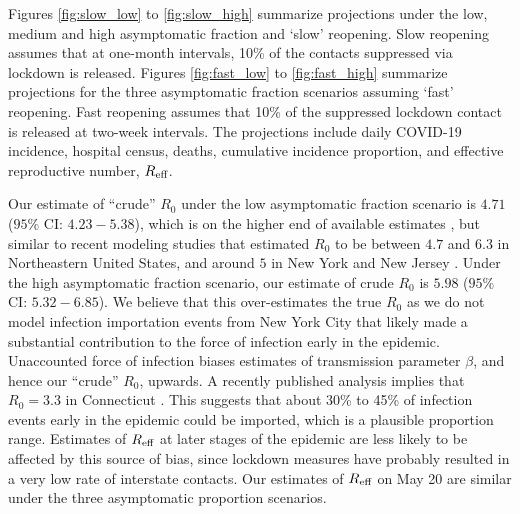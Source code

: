 \documentclass[11pt]{article}
\begin{document}
Figures \ref{fig:slow_low} to \ref{fig:slow_high} summarize projections under the low, medium and high asymptomatic fraction and `slow' reopening. Slow reopening assumes that at one-month intervals, 10\% of the contacts suppressed via lockdown is released. Figures \ref{fig:fast_low} to \ref{fig:fast_high} summarize projections for the three asymptomatic fraction scenarios assuming `fast' reopening. Fast reopening assumes that 10\% of the suppressed lockdown contact is released at two-week intervals. The projections include daily COVID-19 incidence, hospital census, deaths, cumulative incidence proportion, and effective reproductive number, $R\textsubscript{eff}$. 

Our estimate of ``crude'' $R_0$ under the low asymptomatic fraction scenario is $4.71$ ($95\%$ CI: $4.23 - 5.38$), which is on the higher end of available estimates \citep{cdc2020scenarios, li2020early, li2020substantial, kissler2020projecting, ferguson2020impact, perez2020importance, he2020estimation, chow2020global}, but similar to recent modeling studies that estimated $R_0$ to be between $4.7$  and $6.3$ in Northeastern United States, and around $5$ in New York and New Jersey \citep{miller2020mobility, chow2020global}. Under the high asymptomatic fraction scenario, our estimate of crude $R_0$ is $5.98$ ($95\%$ CI: $5.32 - 6.85$). We believe that this over-estimates the true $R_0$ as we do not model infection importation events from New York City that likely made a substantial contribution to the force of infection early in the epidemic. 
Unaccounted force of infection biases estimates of transmission parameter $\beta$, and hence our ``crude'' $R_0$, upwards. 
A recently published analysis implies that $R_0 = 3.3$ in Connecticut \citep{kaplan2020covid}. This suggests that about 30\% to 45\% of infection events early in the epidemic could be imported, which is a plausible proportion range. 
Estimates of $R\textsubscript{eff}$ at later stages of the epidemic are less likely to be affected by this source of bias, since lockdown measures have probably resulted in a very low rate of interstate contacts. Our estimates of $R\textsubscript{eff}$ on May 20 are similar under the three asymptomatic proportion scenarios.
\end{document}
